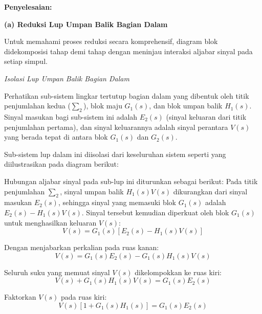 \documentclass[11pt,a4paper]{article}
\begin{document}
\textbf{Penyelesaian:}

\textbf{(a) Reduksi Lup Umpan Balik Bagian Dalam}

Untuk memahami proses reduksi secara komprehensif, diagram blok didekomposisi tahap demi tahap dengan meninjau interaksi aljabar sinyal pada setiap simpul.

\textit{Isolasi Lup Umpan Balik Bagian Dalam}

Perhatikan sub-sistem lingkar tertutup bagian dalam yang dibentuk oleh titik penjumlahan kedua ($\sum_2$), blok maju $G_1(s)$, dan blok umpan balik $H_1(s)$. Sinyal masukan bagi sub-sistem ini adalah $E_2(s)$ (sinyal keluaran dari titik penjumlahan pertama), dan sinyal keluarannya adalah sinyal perantara $V(s)$ yang berada tepat di antara blok $G_1(s)$ dan $G_2(s)$.

Sub-sistem lup dalam ini diisolasi dari keseluruhan sistem seperti yang diilustrasikan pada diagram berikut:

\begin{center}
\end{center}

Hubungan aljabar sinyal pada sub-lup ini diturunkan sebagai berikut:
Pada titik penjumlahan $\sum_2$, sinyal umpan balik $H_1(s) V(s)$ dikurangkan dari sinyal masukan $E_2(s)$, sehingga sinyal yang memasuki blok $G_1(s)$ adalah $E_2(s) - H_1(s) V(s)$.
Sinyal tersebut kemudian diperkuat oleh blok $G_1(s)$ untuk menghasilkan keluaran $V(s)$:
$$V(s) = G_1(s) \left[ E_2(s) - H_1(s) V(s) \right]$$

Dengan menjabarkan perkalian pada ruas kanan:
$$V(s) = G_1(s) E_2(s) - G_1(s) H_1(s) V(s)$$

Seluruh suku yang memuat sinyal $V(s)$ dikelompokkan ke ruas kiri:
$$V(s) + G_1(s) H_1(s) V(s) = G_1(s) E_2(s)$$

Faktorkan $V(s)$ pada ruas kiri:
$$V(s) \left[ 1 + G_1(s) H_1(s) \right] = G_1(s) E_2(s)$$
\end{document}
